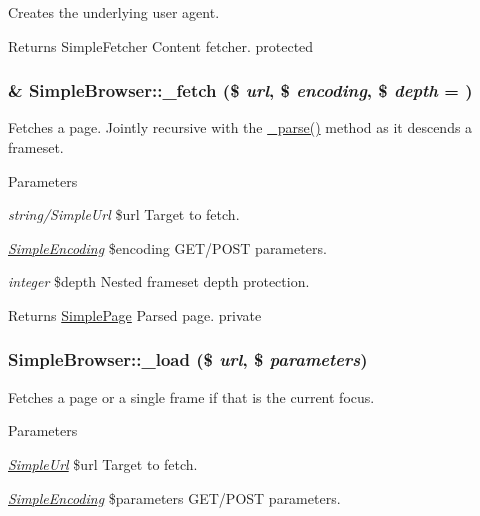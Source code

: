 \label{class_simple_browser_ac9098377a41772b9eafd3b2d2b3fdbea}
Creates the underlying user agent. \begin{DoxyReturn}{Returns}
SimpleFetcher Content fetcher.  protected 
\end{DoxyReturn}
\hypertarget{class_simple_browser_a20a8f7856e67fc79d9ff320d618b8c1f}{
\subsubsection[{\_\-fetch}]{\setlength{\rightskip}{0pt plus 5cm}\& SimpleBrowser::\_\-fetch (\$ {\em url}, \/  \$ {\em encoding}, \/  \$ {\em depth} = {})}}
\label{class_simple_browser_a20a8f7856e67fc79d9ff320d618b8c1f}
Fetches a page. Jointly recursive with the \hyperlink{class_simple_browser_aaa3c3ddf5ec5c06f50a5cd91ce5fe75d}{\_\-parse()} method as it descends a frameset. 
\begin{DoxyParams}{Parameters}
\item[{\em string/SimpleUrl}]\$url Target to fetch. \item[{\em \hyperlink{class_simple_encoding}{SimpleEncoding}}]\$encoding GET/POST parameters. \item[{\em integer}]\$depth Nested frameset depth protection. \end{DoxyParams}
\begin{DoxyReturn}{Returns}
\hyperlink{class_simple_page}{SimplePage} Parsed page.  private 
\end{DoxyReturn}
\hypertarget{class_simple_browser_abcf8e196a5097f77f5db62c3c8a3266a}{
\subsubsection[{\_\-load}]{\setlength{\rightskip}{0pt plus 5cm}SimpleBrowser::\_\-load (\$ {\em url}, \/  \$ {\em parameters})}}
\label{class_simple_browser_abcf8e196a5097f77f5db62c3c8a3266a}
Fetches a page or a single frame if that is the current focus. 
\begin{DoxyParams}{Parameters}
\item[{\em \hyperlink{class_simple_url}{SimpleUrl}}]\$url Target to fetch. \item[{\em \hyperlink{class_simple_encoding}{SimpleEncoding}}]\$parameters GET/POST parameters. \end{DoxyParams}
